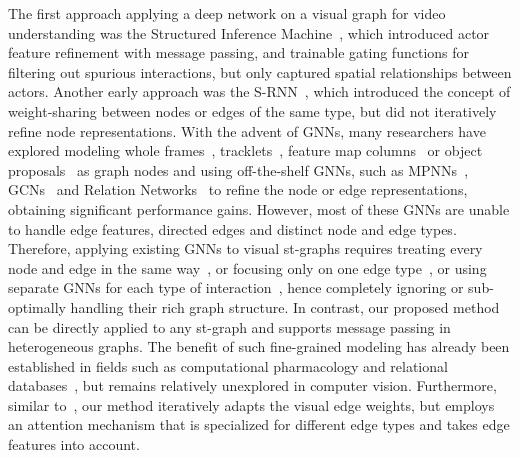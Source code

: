 \documentclass[runningheads]{llncs}
\begin{document}
The first approach applying a deep network on a visual graph for video understanding was the Structured Inference Machine~\cite{Deng:CVPR16}, which introduced actor feature refinement with message passing, and trainable gating functions for filtering out spurious interactions, but only captured spatial relationships between actors. 
Another early approach was the S-RNN~\cite{Jain:CVPR16}, which introduced the concept of weight-sharing between nodes or edges of the same type, but did not iteratively refine node representations. With the advent of \ac{GNN}s, many researchers have explored modeling whole frames~\cite{Zhou:ECCV18}, tracklets~\cite{Zhang:CVPR19}, feature map columns~\cite{Sun:ECCV18,Girdhar:CVPR19,Nicolicioiu:NIPS19} or object proposals~\cite{Wang:ECCV18,Huang:BMVC19,Yuan:ICCV17} as graph nodes and using off-the-shelf GNNs, such as MPNNs~\cite{Gilmer:ICML17}, GCNs~\cite{Kipf:ICLR17} and Relation Networks~\cite{Ibrahim:ECCV18,Sun:ECCV18,Zhou:ECCV18,Baradel:ECCV18} to refine the node or edge representations, obtaining significant performance gains. However, most of these \ac{GNN}s are unable to handle edge features, directed edges and distinct node and edge types.
Therefore, applying existing GNNs to visual st-graphs requires treating every node and edge in the same way~\cite{Baradel:ECCV18,Girdhar:CVPR19}, or focusing only on one edge type~\cite{Sun:ECCV18,Zhou:ECCV18,Ma:CVPR18,Huang:BMVC19,Ibrahim:ECCV18}, or using separate GNNs for each type of interaction~\cite{Wang:ECCV18,Zhang:CVPR19,Ghosh:WACV20}, hence completely ignoring or sub-optimally handling their rich graph structure. In contrast, our proposed method can be directly applied to any st-graph and supports message passing in heterogeneous graphs. The benefit of such fine-grained modeling has already been established in fields such as computational pharmacology and relational databases~\cite{Zitnik:Bioinformatics18,Gong:CVPR19,Schlichtkrull:ESWC18}, but remains relatively unexplored in computer vision. Furthermore, similar to~\cite{Qi:ECCV18,Girdhar:CVPR19}, our method iteratively adapts the visual edge weights, but employs an attention mechanism that is specialized for different edge types and takes edge features into account.
\end{document}

